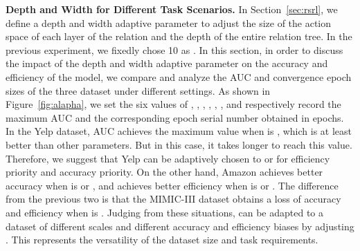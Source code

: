 \textbf{Depth and Width for Different Task Scenarios. }
In Section~\ref{sec:rsrl}, we define a depth and width adaptive parameter  to adjust the size of the action space of each layer of the relation and the depth of the entire relation tree. 
In the previous experiment, we fixedly chose 10 as .
In this section, in order to discuss the impact of the depth and width adaptive parameter on the accuracy and efficiency of the \RioGNN model, we compare and analyze the AUC and convergence epoch sizes of the three dataset under different settings.
As shown in Figure~\ref{fig:alapha}, we set the six  values of , , , , , , and respectively record the maximum AUC and the corresponding epoch serial number obtained in  epochs. 
In the Yelp dataset, AUC achieves the maximum value when  is , which is at least  better than other parameters. 
But in this case, it takes longer to reach this value. 
Therefore, we suggest that Yelp can be adaptively chosen  to  or  for efficiency priority and accuracy priority.
On the other hand, Amazon achieves better accuracy when  is  or , and achieves better efficiency when  is  or . 
The difference from the previous two is that the MIMIC-III dataset obtains a loss of accuracy and efficiency when  is .
Judging from these situations, \RioGNN can be adapted to a dataset of different scales and different accuracy and efficiency biases by adjusting . 
This represents the versatility of the dataset size and task requirements.



